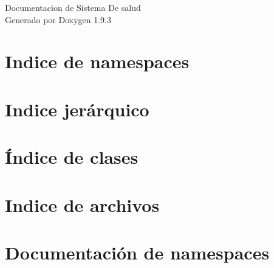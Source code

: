 \documentclass[twoside]{book}
\newcommand{\+}{\discretionary{\mbox{\scriptsize$\hookleftarrow$}}{}{}}
\newcommand{\clearemptydoublepage}{%
    \newpage{\pagestyle{empty}\cleardoublepage}%
  }
\begin{document}
  \raggedbottom
    \hypersetup{pageanchor=false,
                bookmarksnumbered=true,
                pdfencoding=unicode
               }
  \begin{titlepage}
  \vspace*{7cm}
  \begin{center}%
  {\Large Documentacion de Sistema De salud}\\
  \vspace*{1cm}
  {\large Generado por Doxygen 1.9.3}\\
  \end{center}
  \end{titlepage}
  \clearemptydoublepage
  \tableofcontents
  \clearemptydoublepage
  \hypersetup{pageanchor=true}
\chapter{Indice de namespaces}

\chapter{Indice jerárquico}

\chapter{Índice de clases}

\chapter{Indice de archivos}

\chapter{Documentación de namespaces}





\end{document}
